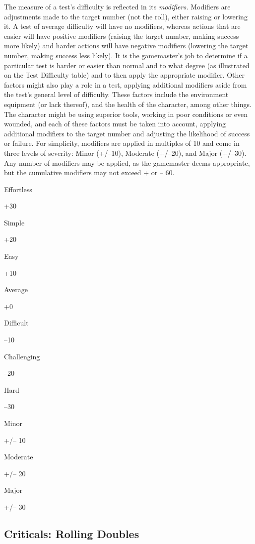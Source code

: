 The measure of a test's difficulty
is reflected in its \textit{modifiers.}
Modifiers are adjustments made 
to the target number (not the 
roll), either raising or lowering 
it. A test of average difficulty 
will have no modifiers, whereas 
actions that are easier will have 
positive modifiers (raising the 
target number, making success 
more likely) and harder actions
will have negative modifiers
(lowering the target number,
making success less likely). It is 
the gamemaster's job to determine
if a particular test is harder
or easier than normal and to 
what degree (as illustrated on the 
Test Difficulty table) and to then 
apply the appropriate modifier.
Other factors might also play a 
role in a test, applying additional 
modifiers aside from the test's 
general level of difficulty. These factors include the environment
equipment (or lack thereof), and the health
of the character, among other things. The character 
might be using superior tools, working in poor conditions
or even wounded, and each of these factors must
be taken into account, applying additional modifiers 
to the target number and adjusting the likelihood of 
success or failure.
For simplicity, modifiers are applied in multiples of 
10 and come in three levels of severity: Minor (+/–10), 
Moderate (+/–20), and Major (+/–30). Any number of 
modifiers may be applied, as the gamemaster deems 
appropriate, but the cumulative modifiers may not 
exceed + or – 60.

Effortless

+30

Simple

+20

Easy

+10

Average

+0

Difficult

–10

Challenging

–20

Hard

–30

Minor

+/– 10

Moderate

+/– 20

Major

+/– 30

\subsection{Criticals: Rolling Doubles}


